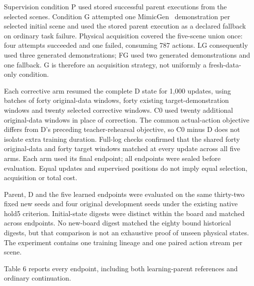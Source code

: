 \documentclass[10pt,letterpaper]{article}
\begin{document}
Supervision condition P used stored successful parent executions from
the selected scenes. Condition G attempted one MimicGen~\cite{Mandlekar2023MimicGen} demonstration
per selected initial scene and used the stored parent execution as a
declared fallback on ordinary task failure. Physical acquisition covered
the five-scene union once: four attempts succeeded and one failed,
consuming 787 actions. LG consequently used three generated
demonstrations; FG used two generated demonstrations and one fallback. G
is therefore an acquisition strategy, not uniformly a fresh-data-only
condition.

Each corrective arm resumed the complete D state for 1,000 updates,
using batches of forty original-data windows, forty existing
target-demonstration windows and twenty selected corrective windows. C0
used twenty additional original-data windows in place of correction. The
common actual-action objective differs from D's preceding
teacher-rehearsal objective, so C0 minus D does not isolate extra
training duration. Full-log checks confirmed that the shared forty
original-data and forty target windows matched at every update across
all five arms. Each arm used its final endpoint; all endpoints were
sealed before evaluation. Equal updates and supervised positions do not
imply equal selection, acquisition or total cost.

Parent, D and the five learned endpoints were evaluated on the same
thirty-two fixed new seeds and four original development seeds under the
existing native hold5 criterion. Initial-state digests were distinct
within the board and matched across endpoints. No new-board digest
matched the eighty bound historical digests, but that comparison is not
an exhaustive proof of unseen physical states. The experiment contains
one training lineage and one paired action stream per scene.

Table 6 reports every endpoint, including both learning-parent
references and ordinary continuation.
\end{document}
